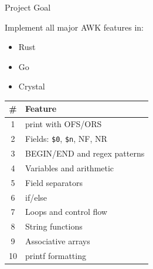 \documentclass[aspectratio=169]{beamer}
\begin{document}
\begin{frame}{Project Goal}

Implement all major AWK features in:

\vspace{1em}

\begin{itemize}
  \item Rust
  \item Go
  \item Crystal
\end{itemize}

\vspace{1em}

\begin{table}
\small
\begin{tabular}{cl}
\toprule
\# & Feature \\
\midrule
1 & print with OFS/ORS \\
2 & Fields: \texttt{\$0}, \texttt{\$n}, NF, NR \\
3 & BEGIN/END and regex patterns \\
4 & Variables and arithmetic \\
5 & Field separators \\
6 & if/else \\
7 & Loops and control flow \\
8 & String functions \\
9 & Associative arrays \\
10 & printf formatting \\
\bottomrule
\end{tabular}
\end{table}

\end{frame}
\end{document}
